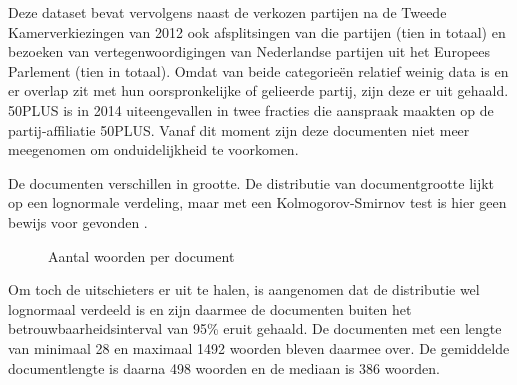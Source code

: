 Deze dataset bevat vervolgens naast de verkozen partijen na de Tweede Kamerverkiezingen van 2012 ook afsplitsingen van die partijen (tien in totaal) en bezoeken van vertegenwoordigingen van Nederlandse partijen uit het Europees Parlement (tien in totaal). Omdat van beide categorieën relatief weinig data is en er overlap zit met hun oorspronkelijke of gelieerde partij, zijn deze er uit gehaald. 50PLUS is in 2014 \cite{50PLUSNRC} uiteengevallen in twee fracties die aanspraak maakten op de partij-affiliatie 50PLUS. Vanaf dit moment zijn deze documenten niet meer meegenomen om onduidelijkheid te voorkomen.\par

De documenten verschillen in grootte. De distributie van documentgrootte lijkt op een lognormale verdeling, maar met een Kolmogorov-Smirnov test is hier geen bewijs voor gevonden \cite{Scipy}.

\begin{figure}[H]
    \centering
    \hspace*{-1in}
    \caption{Aantal woorden per document}%
    \label{fig:example}%
\end{figure}
Om toch de uitschieters er uit te halen, is aangenomen dat de distributie wel lognormaal verdeeld is en zijn daarmee de documenten buiten het betrouwbaarheidsinterval van 95\% eruit gehaald. De documenten met een lengte van minimaal 28 en maximaal 1492 woorden bleven daarmee over. De gemiddelde documentlengte is daarna 498 woorden en de mediaan is 386 woorden.\par

